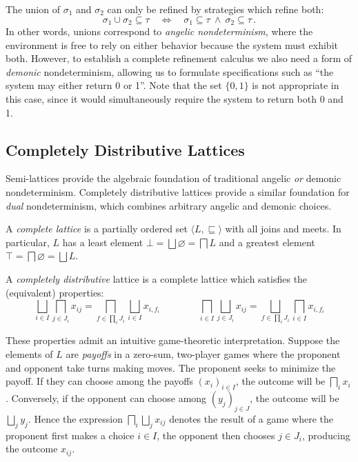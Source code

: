 \documentclass[acmsmall,review,anonymous]{acmart}\settopmatter{printfolios=true,printccs=false,printacmref=false}
\begin{document}
The union of $\sigma_1$ and $\sigma_2$
can only be refined by strategies which refine both:
\[
  \sigma_1 \cup \sigma_2 \subseteq \tau
  \quad\Leftrightarrow\quad
  \sigma_1 \subseteq \tau \:\wedge\:
  \sigma_2 \subseteq \tau
  \,.
\]
In other words,
unions correspond to \emph{angelic nondeterminism},
where the environment is free to rely on either behavior
because the system must exhibit both.
However,
to establish a complete refinement calculus
we also need a form of \emph{demonic} nondeterminism,
allowing us to formulate specifications such as
``the system may either return 0 or 1''.
Note that the set $\{0, 1\}$ is not appropriate in this case,
since it would simultaneously require the system
to return both 0 and 1.


\subsection{Completely Distributive Lattices} %

Semi-lattices provide the algebraic foundation
of traditional angelic \emph{or} demonic nondeterminism.
Completely distributive lattices
provide a similar foundation for
\emph{dual} nondeterminism,
which combines arbitrary angelic and demonic choices.

\begin{definition}
A \emph{complete lattice}
is a partially ordered set $\langle L, {\sqsubseteq} \rangle$
with all joins and meets.
In particular, $L$
has a least element $\bot = \bigsqcup \varnothing = \bigsqcap L$
and a greatest element $\top = \bigsqcap \varnothing = \bigsqcup L$.

A \emph{completely distributive} lattice
is a complete lattice which satisfies
the (equivalent) properties:
\[
  \bigsqcup_{i \in I} \bigsqcap_{j \in J_i} x_{ij} =
  \bigsqcap_{f \in \prod_i J_i} \bigsqcup_{i \in I} x_{i,f_i}
  \qquad\qquad
  \bigsqcap_{i \in I} \bigsqcup_{j \in J_i} x_{ij} =
  \bigsqcup_{f \in \prod_i J_i} \bigsqcap_{i \in I} x_{i,f_i}
\]
\end{definition}

These properties admit an intuitive game-theoretic interpretation.
Suppose the elements of $L$
are \emph{payoffs} in a zero-sum, two-player games
where the proponent and opponent
take turns making moves.
The proponent seeks to minimize the payoff.
If they can choose among the payoffs $(x_i)_{i \in I}$,
the outcome will be $\bigsqcap_i x_i$.
Conversely,
if the opponent can choose among $(y_j)_{j \in J}$,
the outcome will be $\bigsqcup_j y_j$.
Hence the expression
$\bigsqcap_i \bigsqcup_j x_{ij}$
denotes the result of a game where
the proponent first makes a choice $i \in I$,
the opponent then chooses $j \in J_i$,
producing the outcome $x_{ij}$.
\end{document}
